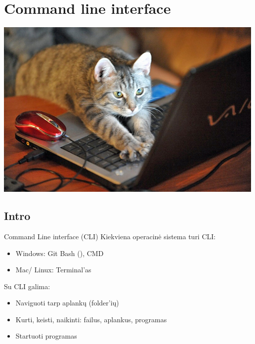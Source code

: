 \documentclass[11pt,xcolor=table]{beamer}
\begin{document}
\section{Command line interface}

\begin{frame}
\includegraphics[scale=0.5]{cat_pc.jpeg}
\end{frame}

\subsection{Intro}

\begin{frame}{Command Line interface (CLI)}
Kiekviena operacinė sistema turi CLI:
\begin{itemize}
\item Windows: Git Bash (), CMD
\item Mac/ Linux: Terminal'as
\end{itemize}
Su CLI galima:
\begin{itemize}
\item Naviguoti tarp aplankų (folder'ių)
\item Kurti, keisti, naikinti: failus, aplankus, programas
\item Startuoti programas
\end{itemize}
\end{frame}
\end{document}
